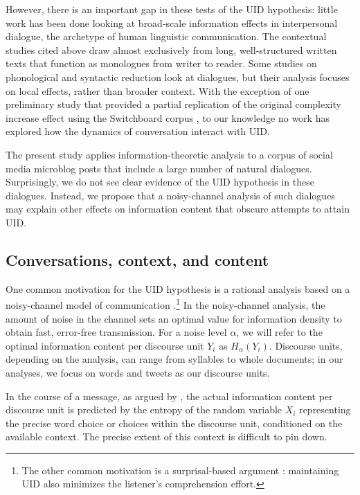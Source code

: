 \documentclass[11pt,letterpaper]{article}
\begin{document}
However, there is an important gap in these tests of the UID hypothesis: little work has been done looking at broad-scale information effects in interpersonal dialogue, the archetype of human linguistic communication.   The contextual studies cited above draw almost exclusively from long, well-structured written texts that function as monologues from writer to reader.  Some studies on phonological and syntactic reduction look at dialogues, but their analysis focuses on local effects, rather than broader context. With the exception of one preliminary study that provided a partial replication of the original complexity increase effect using the Switchboard corpus \cite{vega2009}, to our knowledge no work has explored how the dynamics of conversation interact with UID. 

The present study applies information-theoretic analysis to a corpus of social media microblog posts that include a large number of natural dialogues.  Surprisingly, we do not see clear evidence of the UID hypothesis in these dialogues.  Instead, we propose that a noisy-channel analysis of such dialogues may explain other effects on information content that obscure attempts to attain UID.

\subsection{Conversations, context, and content}

One common motivation for the UID hypothesis is a rational analysis based on a noisy-channel model of communication \cite{levy2007}.\footnote{The other common motivation is a surprisal-based argument \cite{levy2008}: maintaining UID also minimizes the listener's comprehension effort.}  In the noisy-channel analysis, the amount of noise in the channel sets an optimal value for information density to obtain fast, error-free transmission.  For a noise level $\alpha$, we will refer to the optimal information content per discourse unit $Y_i$ as $H_\alpha(Y_i)$.  Discourse units, depending on the analysis, can range from syllables to whole documents; in our analyses, we focus on words and tweets as our discourse units.

In the course of a message, as argued by , the actual information content per discourse unit is predicted by the entropy of the random variable $X_i$ representing the precise word choice or choices within the discourse unit, conditioned on the available context.  The precise extent of this context is difficult to pin down. 
\end{document}
